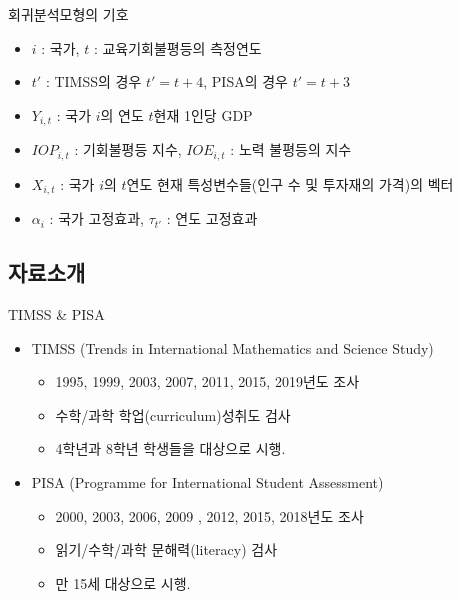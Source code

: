 \documentclass[aspectratio=169,xcolor=dvipsnames,handout]{beamer}
\begin{document}
\begin{frame}{회귀분석모형의 기호}
   \begin{itemize}
        \item $i$ : 국가, $t$ : 교육기회불평등의 측정연도
        \item $t'$ : TIMSS의 경우 $t'=t+4$, PISA의 경우  $t'=t+3$
        \item $Y_{i,t}$ : 국가 $i$의 연도 $t$현재 1인당 GDP
        \item $IOP_{i,t}$ : 기회불평등 지수, $IOE_{i,t}$ : 노력 불평등의 지수
        \item $X_{i,t}$ : 국가 $i$의 $t$연도 현재 특성변수들(인구 수 및 투자재의 가격)의 벡터 
        \item $\alpha _i$ : 국가 고정효과, $\tau _{t'}$ : 연도 고정효과
   \end{itemize} 
\end{frame}

\subsection{자료소개}
\begin{frame}{TIMSS \& PISA}
    \begin{itemize}
        \item TIMSS (Trends in International Mathematics and Science Study)
        \begin{itemize}
            \item 1995, 1999, 2003, 2007, 2011, 2015, 2019년도 조사
            \item 수학/과학 학업(curriculum)성취도 검사
            \item 4학년과 8학년 학생들을 대상으로 시행.
        \end{itemize}
         \item PISA (Programme for International Student Assessment)
        \begin{itemize}
            \item 2000, 2003, 2006, 2009 , 2012, 2015, 2018년도 조사
            \item 읽기/수학/과학 문해력(literacy) 검사
            \item 만 15세 대상으로 시행.
        \end{itemize}
    \end{itemize}
\end{frame}
\end{document}
